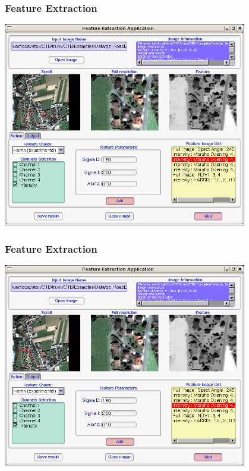 \documentclass[compress]{beamer}
\begin{document}
\begin{frame}
  \frametitle{Feature Extraction}
      \begin{center}
      \includegraphics[width=0.80\textwidth]{Images/feature3.png}
  \end{center}
\end{frame}


\begin{frame}
  \frametitle{Feature Extraction}
      \begin{center}
      \includegraphics[width=0.80\textwidth]{Images/feature4.png}
  \end{center}
\end{frame}
\end{document}
